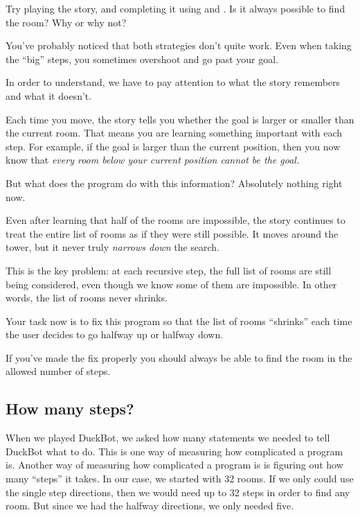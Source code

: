 \begin{TryThisBox}
  Try playing the story, and completing it using  and . Is
  it always possible to find the room? Why or why not?
\end{TryThisBox}

You've probably noticed that both strategies don't quite work. Even when taking the ``big'' steps,
you sometimes overshoot and go past your goal.

In order to understand, we have to pay attention to what the story remembers and what it doesn't.

Each time you move, the story tells you whether the goal is larger or smaller than the current
room. That means you are learning something important with each step. For example, if the goal is
larger than the current position, then you now know that \emph{every room below your current
position cannot be the goal.}

But what does the program do with this information? Absolutely nothing right now.

Even after learning that half of the rooms are impossible, the story continues to treat the entire
list of rooms as if they were still possible. It moves around the tower, but it never truly
\emph{narrows down} the search.

This is the key problem: at each recursive step, the full list of rooms are still being considered,
even though we know some of them are impossible. In other words, the list of rooms never shrinks.

\begin{TryThisBox}
  Your task now is to fix this program so that the list of rooms ``shrinks'' each time the user decides
  to go halfway up or halfway down.
\end{TryThisBox}

If you've made the fix properly you should always be able to find the room in the allowed number of steps.

\subsection{How many steps?}

When we played DuckBot, we asked how many  statements we needed to tell DuckBot what to
do. This is one way of measuring how complicated a program is. Another way of measuring how
complicated a program is is figuring out how many ``steps'' it takes. In our case, we started with
32 rooms. If we only could use the single step directions, then we would need up to 32 steps in
order to find any room. But since we had the halfway directions, we only needed five.

